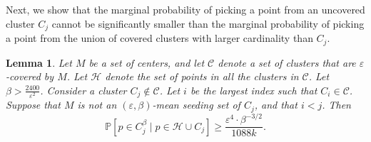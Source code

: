 \documentclass[10pt,a4paper]{amsart}
\newtheorem{lemma}[theorem]{Lemma}
\providecommand{\cal}{\mathcal}
\begin{document}
Next, we show that the marginal probability of picking a point from an uncovered cluster $C_j$ cannot be significantly smaller than the marginal probability of picking a point from the union of covered clusters with larger cardinality than $C_j$.

\begin{lemma}
\label{lem:lbprob}
    Let $M$ be a set of centers, and let ${\cal C}$ denote a set of clusters that are $\varepsilon$-covered by $M$. Let $\mathcal{H}$ denote the set of points in all the clusters in ${\cal C}$. Let $\beta> \frac{2400}{\varepsilon^{2}}$. Consider a cluster $C_j\not\in {\cal C}$. Let $i$ be the largest index such that $C_i\in {\cal C}$. Suppose that $M$ is not an $(\varepsilon,\beta)$-mean seeding set of $C_j$, and that $i < j$. Then
    $$\mathbb{P}[p\in C_j^\beta\mid p\in \mathcal{H}\cup C_j] \geq \frac{\varepsilon^4 \cdot \beta^{-3/2}}{1088k}.$$
\end{lemma}
\end{document}
